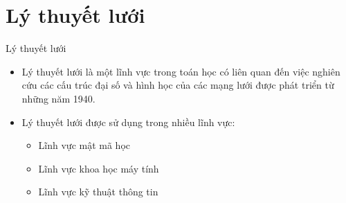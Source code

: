 \documentclass{beamer}
\begin{document}
\section{Lý thuyết lưới}
\begin{frame}{Lý thuyết lưới}
\begin{itemize}
\item Lý thuyết lưới là một lĩnh vực trong toán học có liên quan đến việc nghiên cứu các cấu trúc đại số và hình học của các mạng lưới được phát triển từ những năm 1940.
\item Lý thuyết lưới được sử dụng trong nhiều lĩnh vực:
\begin{itemize}
\item Lĩnh vực mật mã học
\item Lĩnh vực khoa học máy tính
\item Lĩnh vực kỹ thuật thông tin
\end{itemize}
\end{itemize}
\end{frame}

%
\end{document}
